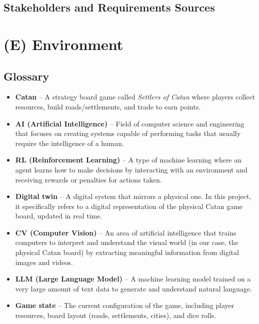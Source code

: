 \documentclass{article}
\begin{document}
\subsection{Stakeholders and Requirements Sources}\label{subsec:stakeholders-and-requirements-sources}

\newpage{}


\section*{(E) Environment}\label{sec:srs-environment}
\renewcommand{\thesubsection}{E.\arabic{subsection}}
\setcounter{subsection}{0}

\subsection{Glossary}\label{subsec:glossary}
\begin{itemize}
    \item \textbf{Catan} – A strategy board game called \textit{Settlers of Catan} where players collect resources, build roads/settlements, and trade to earn points.
    \item \textbf{AI (Artificial Intelligence)} – Field of computer science and engineering that focuses on creating systems capable of performing tasks that usually require the intelligence of a human.
    \item \textbf{RL (Reinforcement Learning)} – A type of machine learning where an agent learns how to make decisions by interacting with an environment and receiving rewards or penalties for actions taken.
    \item \textbf{Digital twin} – A digital system that mirrors a physical one. In this project, it specifically refers to a digital representation of the physical Catan game board, updated in real time.
    \item \textbf{CV (Computer Vision)} – An area of artificial intelligence that trains computers to interpret and understand the visual world (in our case, the physical Catan board) by extracting meaningful information from digital images and videos.
    \item \textbf{LLM (Large Language Model)} – A machine learning model trained on a very large amount of text data to generate and understand natural language.
    \item \textbf{Game state} – The current configuration of the game, including player resources, board layout (roads, settlements, cities), and dice rolls.
\end{itemize}
\end{document}
